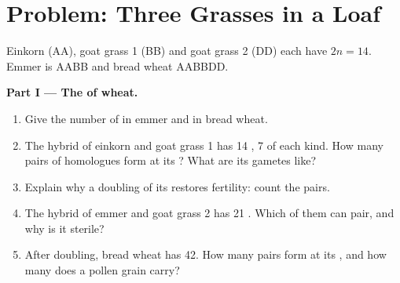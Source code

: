 \section{Problem: Three Grasses in a Loaf}

\begin{problem}
\label{pb:g12:diversification-of-life:1}
Einkorn (AA), goat grass 1 (BB) and goat grass 2 (DD) each have
$2n = 14$. Emmer is AABB and bread wheat AABBDD.

\medskip
\noindent\textbf{Part I --- The  of wheat.}
\begin{enumerate}
  \item Give the number of  in emmer and in bread wheat.
  \item The hybrid of einkorn and goat grass 1 has 14 , 7
        of each kind. How many pairs of homologues form at its
        ? What are its gametes like?
  \item Explain why a doubling of its  restores fertility:
        count the pairs.
  \item The hybrid of emmer and goat grass 2 has 21 . Which
        of them can pair, and why is it sterile?
  \item After doubling, bread wheat has 42. How many pairs form at its
        , and how many  does a pollen grain carry?
\end{enumerate}


\end{problem}
